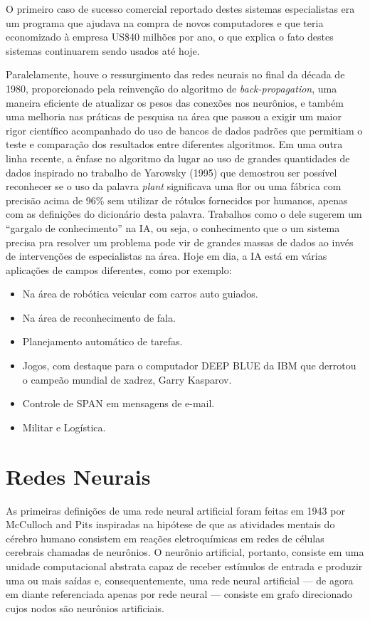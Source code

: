 O primeiro caso de sucesso comercial reportado destes sistemas especialistas
era um programa que ajudava na compra de novos computadores e que teria
economizado à empresa US\$40 milhões por ano, o que explica o fato destes
sistemas continuarem sendo usados até hoje.

Paralelamente, houve o ressurgimento das redes neurais no final da década de
1980, proporcionado pela reinvenção do algoritmo de \emph{back-propagation},
uma maneira eficiente de atualizar os pesos das conexões nos neurônios, e
também uma melhoria nas práticas de pesquisa na área que passou a exigir um
maior rigor científico acompanhado do uso de bancos de dados padrões que
permitiam o teste e comparação dos resultados entre diferentes algoritmos. Em
uma outra linha recente, a ênfase no algoritmo da lugar ao uso de grandes
quantidades de dados inspirado no trabalho de Yarowsky (1995) que demostrou ser
possível reconhecer se o uso da palavra \emph{plant} significava uma flor ou uma
fábrica com precisão acima de 96\% sem utilizar de rótulos fornecidos por
humanos, apenas com as definições do dicionário desta palavra. Trabalhos como o
dele sugerem um ``gargalo de conhecimento'' na IA, ou seja, o conhecimento que
o um sistema precisa pra resolver um problema pode vir de grandes massas de
dados ao invés de intervenções de especialistas na área. Hoje em dia, a IA está
em várias aplicações de campos diferentes, como por exemplo:

\begin{itemize}
\itemsep1pt\parskip0pt
\item
  Na área de robótica veicular com carros auto guiados.
\item
  Na área de reconhecimento de fala.
\item
  Planejamento automático de tarefas.
\item
  Jogos, com destaque para o computador DEEP BLUE da IBM que derrotou o
  campeão mundial de xadrez, Garry Kasparov.
\item
  Controle de SPAN em mensagens de e-mail.
\item
  Militar e Logística.
\end{itemize}

\section{Redes Neurais}

As primeiras definições de uma rede neural artificial foram feitas em 1943 por
McCulloch and Pits inspiradas na hipótese de que as atividades mentais do
cérebro humano consistem em reações eletroquímicas em redes de células
cerebrais chamadas de neurônios. O neurônio artificial, portanto, consiste em
uma unidade computacional abstrata capaz de receber estímulos de entrada e
produzir uma ou mais saídas e, consequentemente, uma rede neural artificial ---
de agora em diante referenciada apenas por rede neural --- consiste em grafo
direcionado cujos nodos são neurônios artificiais.

